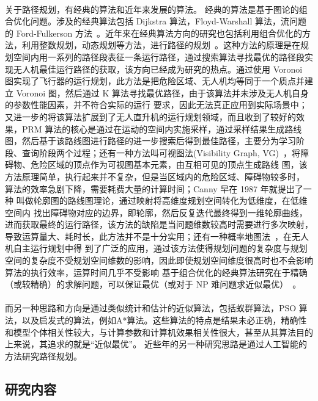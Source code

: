 \documentclass[UTF8,a4paper]{ctexart}
\begin{document}
\paragraph{}关于路径规划，有经典的算法和近年来发展的算法。 经典的算法是基于图论的组合优化问题。涉及的经典算法包括 Dijkstra 算法，Floyd-Warshall 算法，流问题的 Ford-Fulkerson 方法~\cite{introtoalgo}。近年来在经典算法方向的研究也包括利用组合优化的方法，利用整数规划，动态规划等方法，进行路径的规划~\cite{introtoor}。这种方法的原理是在规划空间内用一系列的路径段表征一条运行路径，通过搜索算法寻找最优的路径段实现无人机最佳运行路径的获取，该方向已经成为研究的热点。通过使用 Voronoi 图实现了飞行器的运行规划，此方法是把危险区域、无人机均等同于一个质点并建立 Voronoi 图，然后通过 K 算法寻找最优路径，由于该算法并未涉及无人机自身的参数性能因素，并不符合实际的运行 要求，因此无法真正应用到实际场景中；又进一步的将该算法扩展到了无人直升机的运行规划领域，而且收到了较好的效果，PRM 算法的核心是通过在运动的空间内实施采样，通过采样结果生成路线图，然后基于该路线图进行路径的进一步搜索后得到最佳路径，主要分为学习阶段、查询阶段两个过程；还有一种方法叫可视图法(Visibility Graph, VG)~\cite{2005coordination}，将障碍物、危险区域的顶点作为可视图基本元素，由互相可见的顶点生成路线 图，该方法原理简单，执行起来并不复杂，但是当区域内的危险区域、障碍物较多时， 算法的效率急剧下降，需要耗费大量的计算时间；Canny 早在 1987 年就提出了一种 叫做轮廓图的路线图理论，通过映射将高维度规划空间转化为低维度，在低维空间内 找出障碍物对应的边界，即轮廓，然后反复迭代最终得到一维轮廓曲线，进而获取最终的运行路径，该方法的缺陷是当问题维数较高时需要进行多次映射，导致运算量大、耗时长，此方法并不是十分实用；还有一种概率地图法~\cite{zhangyi2007j}，在无人机自主运行规划中得 到了广泛的应用，通过该方法使得规划问题的复杂度与规划空间的复杂度不受规划空间维数的影响，因此即使规划空间维度很高时也不会影响算法的执行效率，运算时间几乎不受影响 基于组合优化的经典算法研究在于精确（或较精确）的求解问题，可以保证最优（或对于 NP 难问题求近似最优）~\cite{chenyan2009}。
\paragraph{}而另一种思路和方向是通过类似统计和估计的近似算法，包括蚁群算法，PSO 算法，以及启发式的算法，例如A*算法。这些算法的特点是结果未必正确，精确性和模型个体相关性较大，与计算参数和计算机效果相关性很大，甚至从其算法目的上来说，其追求的就是“近似最优”。 近些年的另一种研究思路是通过人工智能的方法研究路径规划。

\subsection{研究内容}
\end{document}
